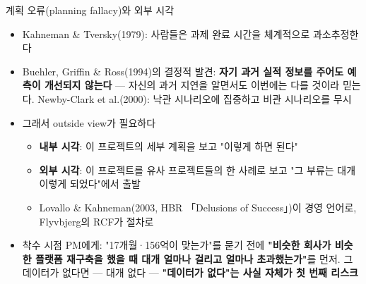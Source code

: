\begin{frame}[allowframebreaks=1.0]{계획 오류(planning fallacy)와 외부 시각}
\small
\begin{itemize}
\item\relax Kahneman \& Tversky(1979): 사람들은 과제 완료 시간을 체계적으로 과소추정한다
\item\relax Buehler, Griffin \& Ross(1994)의 결정적 발견: \textbf{자기 과거 실적 정보를 주어도 예측이 개선되지 않는다} — 자신의 과거 지연을 알면서도 이번에는 다를 것이라 믿는다. Newby-Clark et al.(2000): 낙관 시나리오에 집중하고 비관 시나리오를 무시
\item\relax 그래서 outside view가 필요하다
\par\nobreak
\begin{itemize}
\item\relax \textbf{내부 시각}: 이 프로젝트의 세부 계획을 보고 "이렇게 하면 된다"
\item\relax \textbf{외부 시각}: 이 프로젝트를 유사 프로젝트들의 한 사례로 보고 "그 부류는 대개 이렇게 되었다"에서 출발
\item\relax Lovallo \& Kahneman(2003, HBR 「Delusions of Success」)이 경영 언어로, Flyvbjerg의 RCF가 절차로
\end{itemize}
\item\relax 착수 시점 PM에게: "17개월·156억이 맞는가"를 묻기 전에 \textbf{"비슷한 회사가 비슷한 플랫폼 재구축을 했을 때 대개 얼마나 걸리고 얼마나 초과했는가"}를 먼저. 그 데이터가 없다면 — 대개 없다 — \textbf{"데이터가 없다"는 사실 자체가 첫 번째 리스크}
\end{itemize}
\end{frame}

